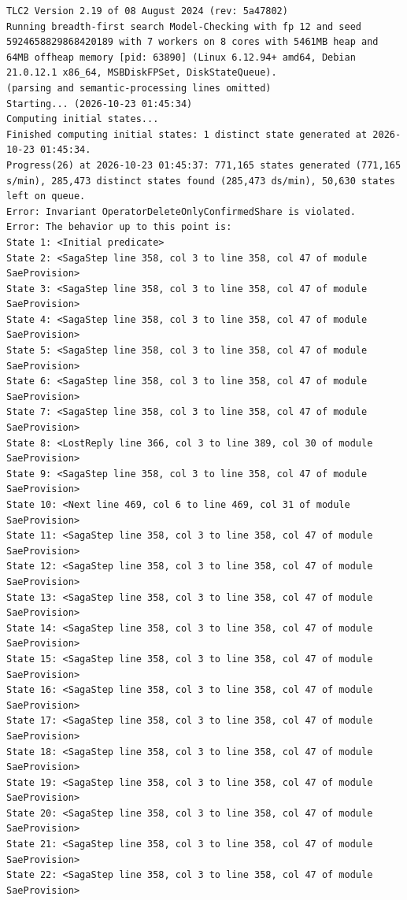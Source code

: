 \documentclass[11pt,a4paper]{article}
\begin{document}
\begin{lstlisting}[float, caption={mutations/mut\_d\_noseen.cfg result}, captionpos=t, label={lst:tlc-mut-d-noseen}]
TLC2 Version 2.19 of 08 August 2024 (rev: 5a47802)
Running breadth-first search Model-Checking with fp 12 and seed 5924658829868420189 with 7 workers on 8 cores with 5461MB heap and 64MB offheap memory [pid: 63890] (Linux 6.12.94+ amd64, Debian 21.0.12.1 x86_64, MSBDiskFPSet, DiskStateQueue).
(parsing and semantic-processing lines omitted)
Starting... (2026-10-23 01:45:34)
Computing initial states...
Finished computing initial states: 1 distinct state generated at 2026-10-23 01:45:34.
Progress(26) at 2026-10-23 01:45:37: 771,165 states generated (771,165 s/min), 285,473 distinct states found (285,473 ds/min), 50,630 states left on queue.
Error: Invariant OperatorDeleteOnlyConfirmedShare is violated.
Error: The behavior up to this point is:
State 1: <Initial predicate>
State 2: <SagaStep line 358, col 3 to line 358, col 47 of module SaeProvision>
State 3: <SagaStep line 358, col 3 to line 358, col 47 of module SaeProvision>
State 4: <SagaStep line 358, col 3 to line 358, col 47 of module SaeProvision>
State 5: <SagaStep line 358, col 3 to line 358, col 47 of module SaeProvision>
State 6: <SagaStep line 358, col 3 to line 358, col 47 of module SaeProvision>
State 7: <SagaStep line 358, col 3 to line 358, col 47 of module SaeProvision>
State 8: <LostReply line 366, col 3 to line 389, col 30 of module SaeProvision>
State 9: <SagaStep line 358, col 3 to line 358, col 47 of module SaeProvision>
State 10: <Next line 469, col 6 to line 469, col 31 of module SaeProvision>
State 11: <SagaStep line 358, col 3 to line 358, col 47 of module SaeProvision>
State 12: <SagaStep line 358, col 3 to line 358, col 47 of module SaeProvision>
State 13: <SagaStep line 358, col 3 to line 358, col 47 of module SaeProvision>
State 14: <SagaStep line 358, col 3 to line 358, col 47 of module SaeProvision>
State 15: <SagaStep line 358, col 3 to line 358, col 47 of module SaeProvision>
State 16: <SagaStep line 358, col 3 to line 358, col 47 of module SaeProvision>
State 17: <SagaStep line 358, col 3 to line 358, col 47 of module SaeProvision>
State 18: <SagaStep line 358, col 3 to line 358, col 47 of module SaeProvision>
State 19: <SagaStep line 358, col 3 to line 358, col 47 of module SaeProvision>
State 20: <SagaStep line 358, col 3 to line 358, col 47 of module SaeProvision>
State 21: <SagaStep line 358, col 3 to line 358, col 47 of module SaeProvision>
State 22: <SagaStep line 358, col 3 to line 358, col 47 of module SaeProvision>

\end{lstlisting}
\end{document}
